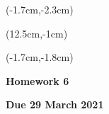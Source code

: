 \documentclass[12pt, oneside]{article}
\begin{document}
\begin{textblock*}{4cm}(-1.7cm,-2.3cm)
\end{textblock*}

\begin{textblock*}{8cm}(12.5cm,-1cm)
\end{textblock*}
\begin{textblock*}{13.5cm}(-1.7cm,-1.8cm)
\end{textblock*}

\vspace{1cm}

\begin{center}
\textbf{\Large Homework 6}

\textbf{Due 29 March 2021}
\end{center}
\end{document}
